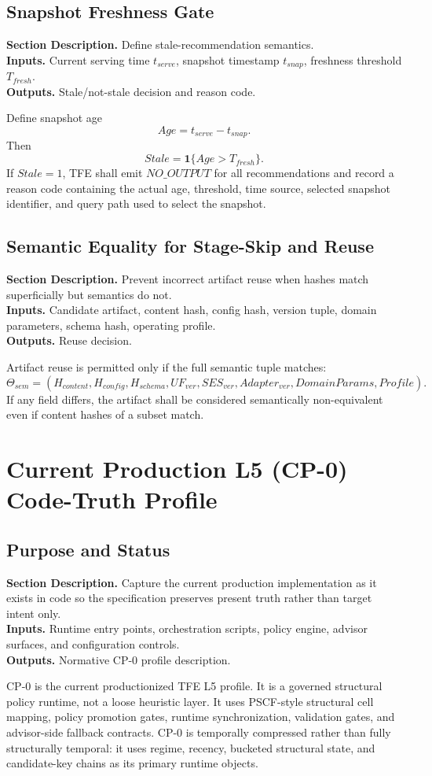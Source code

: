 \documentclass[11pt]{report}
\newcommand{\meta}[3]{\textbf{Section Description.} #1\\
\textbf{Inputs.} #2\\
\textbf{Outputs.} #3\par}
\begin{document}
\section{Snapshot Freshness Gate}
\meta{Define stale-recommendation semantics.}{Current serving time $t_{serve}$, snapshot timestamp $t_{snap}$, freshness threshold $T_{fresh}$.}{Stale/not-stale decision and reason code.}

Define snapshot age
\[
Age = t_{serve}-t_{snap}.
\]
Then
\[
Stale = \mathbf{1}\{Age > T_{fresh}\}.
\]
If $Stale=1$, TFE shall emit $NO\_OUTPUT$ for all recommendations and record a reason code containing the actual age, threshold, time source, selected snapshot identifier, and query path used to select the snapshot.

\section{Semantic Equality for Stage-Skip and Reuse}
\meta{Prevent incorrect artifact reuse when hashes match superficially but semantics do not.}{Candidate artifact, content hash, config hash, version tuple, domain parameters, schema hash, operating profile.}{Reuse decision.}

Artifact reuse is permitted only if the full semantic tuple matches:
\[
\Theta_{sem}=(H_{content},H_{config},H_{schema},UF_{ver},SES_{ver},Adapter_{ver},DomainParams,Profile).
\]
If any field differs, the artifact shall be considered semantically non-equivalent even if content hashes of a subset match.


\chapter{Current Production L5 (CP-0) Code-Truth Profile}
\section{Purpose and Status}
\meta{Capture the current production implementation as it exists in code so the specification preserves present truth rather than target intent only.}{Runtime entry points, orchestration scripts, policy engine, advisor surfaces, and configuration controls.}{Normative CP-0 profile description.}

CP-0 is the current productionized TFE L5 profile. It is a governed structural policy runtime, not a loose heuristic layer. It uses PSCF-style structural cell mapping, policy promotion gates, runtime synchronization, validation gates, and advisor-side fallback contracts. CP-0 is temporally compressed rather than fully structurally temporal: it uses regime, recency, bucketed structural state, and candidate-key chains as its primary runtime objects.
\end{document}
